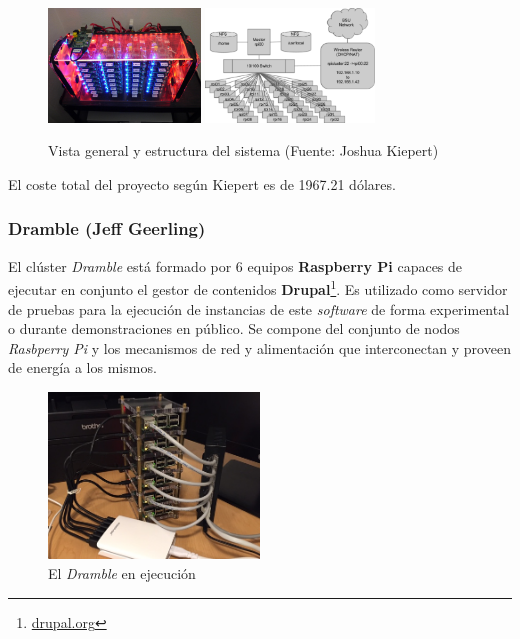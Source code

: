 
\begin{figure}[H]
	\centering
	\includegraphics[width=0.36\textwidth]{Chapter1/Figures/kiepert-main}
	\includegraphics[width=0.4\textwidth]{Chapter1/Figures/kiepert.png}
	\caption[RPiCluster]{Vista general y estructura del sistema (Fuente: Joshua Kiepert)}
	\label{kiepert:structure}
\end{figure}

El coste total del proyecto según Kiepert es de 1967.21 dólares.

\subsubsection{Dramble (Jeff Geerling)}

El clúster \textit{Dramble} está formado por 6 equipos \textbf{Raspberry Pi} capaces de ejecutar en conjunto el gestor de contenidos \textbf{Drupal}\footnote{\href{https://www.drupal.org/}{drupal.org}}. Es utilizado como servidor de pruebas para la ejecución de instancias de este \textit{software} de forma experimental o durante demonstraciones en público\cite{geerlingraspberry}. Se compone del conjunto de nodos \textit{Rasbperry Pi} y los mecanismos de red y alimentación que interconectan y proveen de energía a los mismos.

\begin{figure}[H]
	\centering
	\includegraphics[width=0.5\textwidth]{Chapters/Chapter1/Figures/raspberry-pi-dramble-cluster-wired.jpg}
	\caption[Dramble]{El \textit{Dramble} en ejecución}
	\label{geerling:dramble}
\end{figure}

